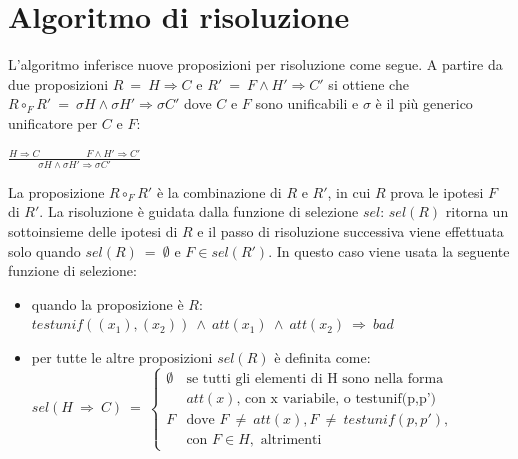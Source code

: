 \documentclass[12pt]{article}
\begin{document}
\section*{Algoritmo di risoluzione}
L'algoritmo inferisce nuove proposizioni per risoluzione come segue. A partire da due proposizioni $R\ =\ H \Rightarrow C$ e $R'\ =\ F \land H' \Rightarrow C'$ si ottiene che $R \circ_F R'\ =\ \sigma H \land \sigma H' \Rightarrow \sigma C'$ dove $C$ e $F$ sono unificabili e $\sigma$ è il più generico unificatore per $C$ e $F$:\\
\begin{center}
    \Large
    $\frac{H\Rightarrow C \hspace{2cm} F \land H' \Rightarrow C'}{\sigma H \land \sigma H' \Rightarrow \sigma C'}$
\end{center}
La proposizione $R \circ_F R'$ è la combinazione di $R$ e $R'$, in cui $R$ prova le ipotesi $F$ di $R'$. La risoluzione è guidata dalla funzione di selezione $sel$: $sel(R)$ ritorna un sottoinsieme delle ipotesi di $R$ e il passo di risoluzione successiva viene effettuata solo quando $sel(R)\ =\ \emptyset$ e $F \in sel(R')$. In questo caso viene usata la seguente funzione di selezione:\\
\begin{itemize}
    \item quando la proposizione è $R$:\\
    
    $testunif((x_1),(x_2))\ \land \ att(x_1)\ \land \ att(x_2)\ \Rightarrow \ bad$
    \item per tutte le altre proposizioni $sel(R)$ è definita come:\\
    
    $
    sel(H\ \Rightarrow \ C)\ =\  
    \begin{cases} 
    \emptyset & \text{se tutti gli elementi di H sono nella forma } \\
    &  att(x) \text{, con x variabile, o testunif(p,p')} \\
    {F} & \text{dove } F\ \neq \ att(x), F\ \neq \ testunif(p,p'),\\
    & \text{con } F \in H, \text{ altrimenti}
    \end{cases}
   $
 \end{itemize}
 
\end{document}
